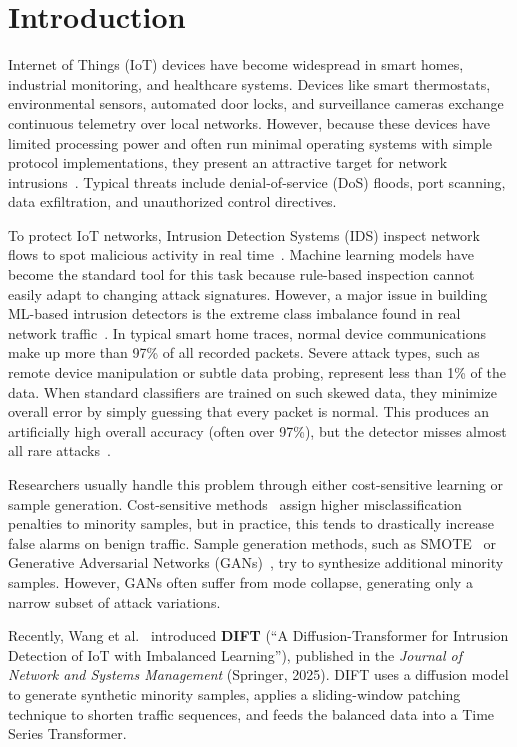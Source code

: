 \section{Introduction}
\label{sec:introduction}

Internet of Things (IoT) devices have become widespread in smart homes, industrial monitoring, and healthcare systems. Devices like smart thermostats, environmental sensors, automated door locks, and surveillance cameras exchange continuous telemetry over local networks. However, because these devices have limited processing power and often run minimal operating systems with simple protocol implementations, they present an attractive target for network intrusions~\cite{khraisat2021critical}. Typical threats include denial-of-service (DoS) floods, port scanning, data exfiltration, and unauthorized control directives.

To protect IoT networks, Intrusion Detection Systems (IDS) inspect network flows to spot malicious activity in real time~\cite{almiani2020deep}. Machine learning models have become the standard tool for this task because rule-based inspection cannot easily adapt to changing attack signatures. However, a major issue in building ML-based intrusion detectors is the extreme class imbalance found in real network traffic~\cite{he2009learning}. In typical smart home traces, normal device communications make up more than 97\% of all recorded packets. Severe attack types, such as remote device manipulation or subtle data probing, represent less than 1\% of the data. When standard classifiers are trained on such skewed data, they minimize overall error by simply guessing that every packet is normal. This produces an artificially high overall accuracy (often over 97\%), but the detector misses almost all rare attacks~\cite{thakkar2023attack}.

Researchers usually handle this problem through either cost-sensitive learning or sample generation. Cost-sensitive methods~\cite{dina2023deep} assign higher misclassification penalties to minority samples, but in practice, this tends to drastically increase false alarms on benign traffic. Sample generation methods, such as SMOTE~\cite{chawla2002smote} or Generative Adversarial Networks (GANs)~\cite{wang2023lightweight}, try to synthesize additional minority samples. However, GANs often suffer from mode collapse, generating only a narrow subset of attack variations.

Recently, Wang et al.~\cite{wang2025dift} introduced \textbf{DIFT} (``A Diffusion-Transformer for Intrusion Detection of IoT with Imbalanced Learning''), published in the \textit{Journal of Network and Systems Management} (Springer, 2025). DIFT uses a diffusion model to generate synthetic minority samples, applies a sliding-window patching technique to shorten traffic sequences, and feeds the balanced data into a Time Series Transformer.

